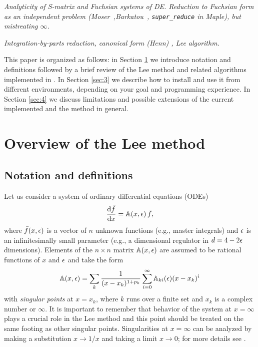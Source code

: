 \documentclass[12pt,a4paper]{article}
\def\M#1{\mathbb{#1}} %
\begin{document}
{\it Analyticity of S-matrix and Fuchsian systems of DE. Reduction to Fuchsian form as an independent problem (Moser~\cite{Mos59},Barkatou~\cite{BP09}, \texttt{super\_reduce} in Maple), but mistreating $\infty$.}

{\it Integration-by-parts reduction, canonical form (Henn) \cite{Henn13}, Lee algorithm.}

This paper is organized as follows: in Section \ref{sec:2} we introduce notation and definitions followed by a brief review of the Lee method \cite{Lee15} and related algorithms implemented in \fuchsia.
In Section \ref{sec:3} we describe how to install \fuchsia and use it from different environments, depending on your goal and programming experience.
In Section \ref{sec:4} we discuss limitations and possible extensions of the current implemented and the method in general.


\section{Overview of the Lee method}
\label{sec:2}


\subsection{Notation and definitions}

Let us consider a system of ordinary differential equations (ODEs)
\begin{equation}
\label{eq:df}
  \frac{\D \bar{f}}{\D x} = \M A(x,\eps)\,\bar{f},
\end{equation}
where $\bar{f}(x,\epsilon)$ is a vector of $n$ unknown functions (e.g., master integrals) and  $\epsilon$ is an infinitesimally small parameter (e.g., a dimensional regulator in $d=4-2\epsilon$ dimensions).
Elements of the $n \times n$ matrix  $\M A(x,\eps)$ are assumed to be rational functions of $x$ and $\epsilon$ and take the form
\begin{equation}
\label{eq:axeps}
  {\M A}(x,\eps) = \sum_k \frac{1}{(x-x_k)^{1+p_k}} \sum_{i=0}^\infty {\M A}_{ki}(\eps) (x-x_k)^i
\end{equation}
with {\em singular points} at $x = x_k$, where $k$ runs over a finite set and $x_k$ is a complex number or $\infty$.
It is important to remember that behavior of the system at $x=\infty$ plays a crucial role in the Lee method and this point should be treated on the same footing as other singular points.
Singularities at $x=\infty$ can be analyzed by making a substitution $x\to1/x$ and taking a limit $x\to0$; for more details see \cite{Bal08}.
\end{document}
